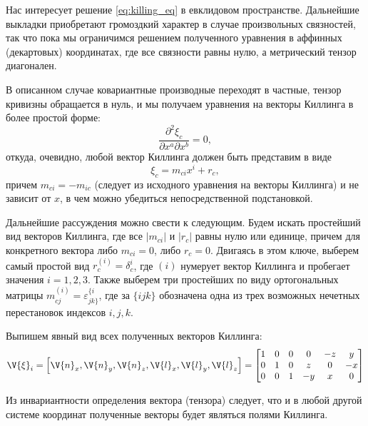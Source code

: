     Нас интересует решение \autoref{eq:killing_eq} в евклидовом пространстве. Дальнейшие выкладки приобретают громоздкий характер в случае произвольных связностей, так что пока мы ограничимся решением полученного уравнения в аффинных (декартовых) координатах, где все связности равны нулю, а метрический тензор диагонален.

    В описанном случае ковариантные производные переходят в частные, тензор кривизны обращается в нуль, и мы получаем уравнения на векторы Киллинга в более простой форме:
    \begin{equation}
        \frac{\partial^2 \xi_c}{\partial x^a \partial x^b} = 0,
    \end{equation}
    откуда, очевидно, любой вектор Киллинга должен быть представим в виде
    \begin{equation}
        \xi_c = m_{ci} x^i + r_c,
    \end{equation}
    причем $m_{ci} = - m_{ic}$ (следует из исходного уравнения на векторы Киллинга) и не зависит от $x$, в чем можно убедиться непосредственной подстановкой.

    Дальнейшие рассуждения можно свести к следующим. Будем искать простейший вид векторов Киллинга, где все $|m_{ci}|$ и $|r_c|$ равны нулю или единице, причем для конкретного вектора либо $m_{ci} = 0$, либо $r_c = 0$. Двигаясь в этом ключе, выберем самый простой вид $r^{(i)}_c = \delta^i_c$, где $(i)$ нумерует вектор Киллинга и пробегает значения $i = 1,2,3$. Также выберем три простейших по виду ортогональных матрицы $m^{(i)}_{cj} = \varepsilon^{\{i}_{jk\}}$, где за $\{ijk\}$ обозначена одна из трех возможных нечетных перестановок индексов $i,j,k$.

    Выпишем явный вид всех полученных векторов Киллинга:
    \begin{equation}
        \V{\xi}_i
        =
        \left[
            \V{n}_x, \V{n}_y, \V{n}_z,
            \V{l}_x, \V{l}_y, \V{l}_z
        \right]
        =
        \begin{bmatrix}
            1 & 0 & 0 & 0  & -z & y  \\
            0 & 1 & 0 & z  & 0  & -x \\
            0 & 0 & 1 & -y & x  & 0
        \end{bmatrix}
    \end{equation}

    Из инвариантности определения вектора (тензора) следует, что и в любой другой системе координат полученные векторы будет являться полями Киллинга.

